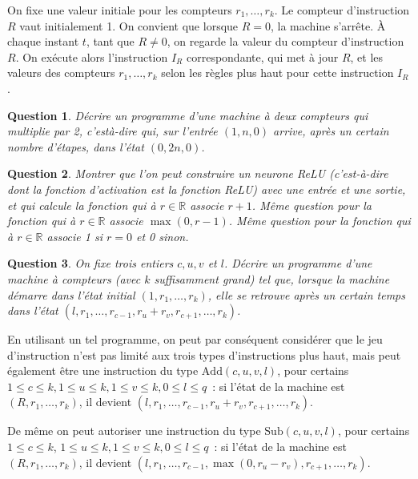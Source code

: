 \documentclass[10pt]{article}
\newtheorem{question}{Question}
\begin{document}
On fixe une valeur initiale pour les compteurs $r_{1}, \ldots, r_{k}$. Le compteur d'instruction $R$ vaut initialement 1. On convient que lorsque $R=0$, la machine s'arrête. À chaque instant $t$, tant que $R \neq 0$, on regarde la valeur du compteur d'instruction $R$. On exécute alors l'instruction $I_{R}$ correspondante, qui met à jour $R$, et les valeurs des compteurs $r_{1}, \ldots, r_{k}$ selon les règles plus haut pour cette instruction $I_{R}$.

\begin{question}
	Décrire un programme d'une machine à deux compteurs qui multiplie par 2, c'està-dire qui, sur l'entrée $(1, n, 0)$ arrive, après un certain nombre d'étapes, dans l'état $(0,2 n, 0)$.
\end{question}

\begin{question}
	Montrer que l'on peut construire un neurone ReLU (c'est-à-dire dont la fonction d'activation est la fonction ReLU) avec une entrée et une sortie, et qui calcule la fonction qui à $r \in ℝ$ associe $r+1$. Même question pour la fonction qui à $r \in ℝ$ associe $\max (0, r-1)$. Même question pour la fonction qui à $r \in ℝ$ associe 1 si $r=0$ et 0 sinon.
\end{question}

\begin{question}
	On fixe trois entiers $c, u, v$ et $l$. Décrire un programme d'une machine à compteurs (avec $k$ suffisamment grand) tel que, lorsque la machine démarre dans l'état initial $\left(1, r_{1}, \ldots, r_{k}\right)$, elle se retrouve après un certain temps dans l'état $\left(l, r_{1}, \ldots, r_{c-1}, r_{u}+r_{v}, r_{c+1}, \ldots, r_{k}\right)$.
\end{question}

En utilisant un tel programme, on peut par conséquent considérer que le jeu d'instruction n'est pas limité aux trois types d'instructions plus haut, mais peut également être une instruction du type $\mathrm{Add}(c, u, v, l)$, pour certains $1 ≤ c ≤ k, 1 ≤ u ≤ k, 1 ≤ v ≤ k, 0 ≤ l ≤ q$ : si l'état de la machine est $\left(R, r_{1}, \ldots, r_{k}\right)$, il devient $\left(l, r_{1}, \ldots, r_{c-1}, r_{u}+r_{v}, r_{c+1}, \ldots, r_{k}\right)$.

De même on peut autoriser une instruction du type $\mathrm{Sub}(c, u, v, l)$, pour certains $1 ≤ c ≤ k$, $1 ≤ u ≤ k, 1 ≤ v ≤ k, 0 ≤ l ≤ q$ : si l'état de la machine est $\left(R, r_{1}, \ldots, r_{k}\right)$, il devient $\left(l, r_{1}, \ldots, r_{c-1}, \max \left(0, r_{u}-r_{v}\right), r_{c+1}, \ldots, r_{k}\right)$.
\end{document}
